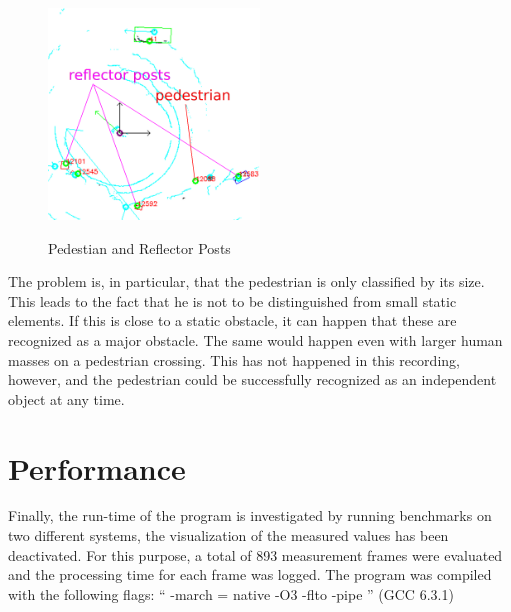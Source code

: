 \documentclass[11pt,oneside,openright]{mpreport}
\begin{document}
\begin{figure}[!htb]
  \caption{Pedestian and Reflector Posts} 
  \centering
  \includegraphics[width=0.5\textwidth]{bilder/reflector_posts.png}
 \label{refPosts}
\end{figure}
% 
The problem is, in particular, that the pedestrian is only classified by its size. 
This leads to the fact that he is not to be distinguished from small static elements.
If this is close to a static obstacle, it can happen that these are recognized as a major obstacle.
The same would happen even with larger human masses on a pedestrian crossing.
This has not happened in this recording, however, and the pedestrian could be successfully recognized as an independent object at any time.


\section{Performance}

Finally, the run-time of the program is investigated by running benchmarks on two different systems,
the visualization of the measured values has been deactivated. For this purpose, a total of 893 measurement
frames were evaluated and the processing time for each frame was logged. 
The program was compiled with the following flags: `` -march = native -O3 -flto -pipe '' (GCC 6.3.1)
\end{document}
